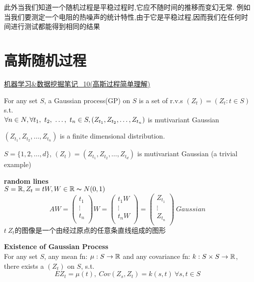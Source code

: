 此外当我们知道一个随机过程是平稳过程时,它应不随时间的推移而变幻无常.
例如当我们要测定一个电阻的热噪声的统计特性,由于它是平稳过程,因而我们在任何时间进行测试都能得到相同的结果

\section{高斯随机过程}
\href{http://www.cnblogs.com/tornadomeet/archive/2013/06/14/3135380.html}{机器学习\&数据挖掘笔记\_10(高斯过程简单理解)}
\begin{definition}
For any set $S$, a Gaussian process(GP) on $S$ is a set of r.v.s 
$(Z_t) = (Z_t: t \in S)$ s.t.\\
$\forall n \in N, \forall t_1,~t_2,~\ldots,~t_n \in S, (Z_{t_1}, Z_{t_2}, \ldots, Z_{t_n})$ is mutivariant Gaussian
\end{definition}
$(Z_{t_1}, Z_{t_2}, \ldots, Z_{t_n})$ is a finite dimensional distribution.

\begin{example}
		$S = \{1,2,\ldots, d\}$, $(Z_t) = (Z_{t_1}, Z_{t_2}, \ldots, Z_{t_d})$ is mutivariant Gaussian (a trivial example)
\end{example}

\begin{example}
\textbf{random lines}\\
$S = \mathbb{R}, Z_t = t W, W \in \mathbb{R} \thicksim{N}(0,1)$
$$
AW = 
\begin{pmatrix}
t_1 \\
\vdots \\
t_n \\
\end{pmatrix}
W
=
\begin{pmatrix}
t_1 W \\
\vdots \\
t_n W\\
\end{pmatrix}
=
\begin{pmatrix}
Z_{t_1} \\
\vdots \\
Z_{t_n} \\
\end{pmatrix}
\ Gaussian
$$
$t\ Z_t$的图像是一个由经过原点的任意条直线组成的图形
\end{example}

\begin{theorem}
\textbf{Existence of Gaussian Process}\\
For any set $S$, any mean fn: $\mu: S \rightarrow \mathbb{R}$ and any covariance fn: $k: S \times S \rightarrow  \mathbb{R}$, there exists a $(Z_t)$ on $S$, s.t.
$$EZ_t = \mu(t),\ Cov(Z_s, Z_t) = k(s,t)\ \forall s,t \in S$$
\end{theorem}

